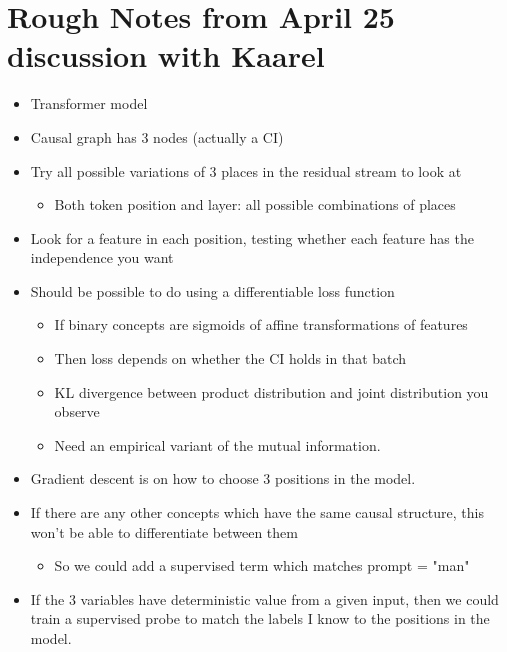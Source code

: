 \documentclass{article}
\begin{document}
\section{Rough Notes from April 25 discussion with Kaarel}
\begin{itemize}
    \item Transformer model
    \item Causal graph has 3 nodes (actually a CI)
    \item Try all possible variations of 3 places in the residual stream to look at
    \begin{itemize}
        \item Both token position and layer: all possible combinations of places
    \end{itemize}
    \item Look for a feature in each position, testing whether each feature has the independence you want
    \item Should be possible to do using a differentiable loss function
    \begin{itemize}
        \item If binary concepts are sigmoids of affine transformations of features
        \item Then loss depends on whether the CI holds in that batch
        \item KL divergence between product distribution and joint distribution you observe
        \item Need an empirical variant of the mutual information.
    \end{itemize}
    \item Gradient descent is on how to choose 3 positions in the model.
    \item If there are any other concepts which have the same causal structure, this won't be able to differentiate between them
    \begin{itemize}
        \item So we could add a supervised term which matches prompt = "man"
    \end{itemize}
    \item If the 3 variables have deterministic value from a given input, then we could train a supervised probe to match the labels I know to the positions in the model.
\end{itemize}
\end{document}
